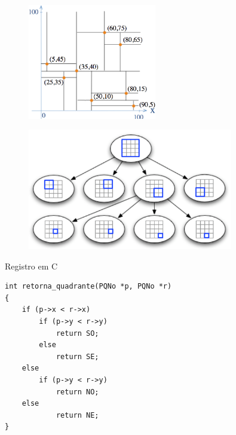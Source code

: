 \documentclass[red, tikz, aspectratio=169, xcolor=dvipsnames]{beamer}
\begin{document}
			\begin{frame}
				\begin{figure}
					\centering
					\includegraphics[width=0.5\textwidth]{img/example.png}
					
					\vspace{10px}
					
				\end{figure}
			\end{frame}

			\begin{frame}
				\begin{figure}
					\centering
					\includegraphics[width=0.8\textwidth]{img/introducao.png}	
				\end{figure}
			\end{frame}

			\begin{frame}[fragile]{Registro em C}
				\begin{verbatim}
int retorna_quadrante(PQNo *p, PQNo *r) 
{
	if (p->x < r->x)
		if (p->y < r->y)
			return SO;
		else
			return SE;
	else
		if (p->y < r->y)
			return NO;
	else
			return NE;
}
				\end{verbatim}
			\end{frame}
\end{document}
